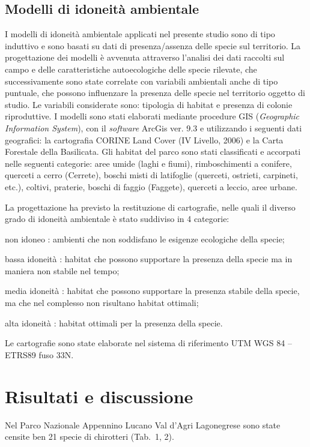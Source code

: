 \begin{multicols}{2}
\subsection*{Modelli di idoneità ambientale}
I modelli di idoneità ambientale applicati nel presente studio sono di tipo induttivo e sono basati su dati di presenza/assenza delle specie sul territorio. La progettazione dei modelli è avvenuta attraverso l’analisi dei dati raccolti sul campo e delle caratteristiche autoecologiche delle specie rilevate, che successivamente sono state correlate con variabili ambientali anche di tipo puntuale, che possono influenzare la presenza delle specie nel territorio oggetto di studio. Le variabili considerate sono: tipologia di habitat e presenza di colonie riproduttive. I modelli sono stati elaborati mediante procedure GIS (\textit{Geographic Information System}), con il \textit{software} ArcGis ver. 9.3 e utilizzando i seguenti dati geografici: la cartografia CORINE Land Cover (IV Livello, 2006) e la Carta Forestale della Basilicata. Gli habitat del parco sono stati classificati e accorpati nelle seguenti categorie: aree umide (laghi e fiumi), rimboschimenti a conifere, querceti a cerro (Cerrete), boschi misti di latifoglie (querceti, ostrieti, carpineti, etc.), coltivi, praterie, boschi di faggio (Faggete), querceti a leccio, aree urbane.

La progettazione ha previsto la restituzione di cartografie, nelle quali il diverso grado di idoneità ambientale è stato suddiviso in 4 categorie:
\begin{compactdesc}
\item[non idoneo]: ambienti che non soddisfano le esigenze ecologiche della specie;
\item[bassa idoneità]: habitat che possono supportare la presenza della specie ma in maniera non stabile nel tempo;
\item[media idoneità]: habitat che possono supportare la presenza stabile della specie, ma che nel complesso non risultano habitat ottimali;
\item[alta idoneità]: habitat ottimali per la presenza della specie.  
\end{compactdesc}
Le cartografie sono state elaborate nel sistema di riferimento UTM WGS 84 – ETRS89 fuso 33N.

\section*{Risultati e discussione}
Nel Parco Nazionale Appennino Lucano Val d’Agri Lagonegrese sono state censite ben 21 specie di chirotteri (Tab.~1, 2).


\end{multicols}
